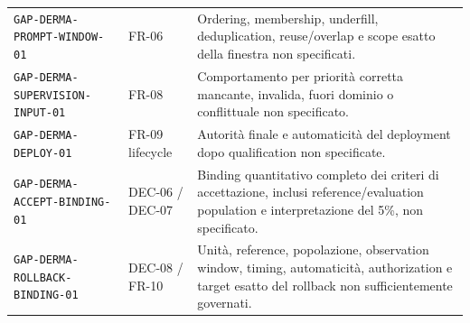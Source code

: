 \documentclass[11pt,a4paper]{article}
\begin{document}
\begin{longtable}{L{50mm}L{29mm}L{64mm}}
\nolinkurl{GAP-DERMA-PROMPT-WINDOW-01} & FR-06 & Ordering, membership, underfill, deduplication, reuse/overlap e scope esatto della finestra non specificati. \\
\nolinkurl{GAP-DERMA-SUPERVISION-INPUT-01} & FR-08 & Comportamento per priorità corretta mancante, invalida, fuori dominio o conflittuale non specificato. \\
\nolinkurl{GAP-DERMA-DEPLOY-01} & FR-09 lifecycle & Autorità finale e automaticità del deployment dopo qualification non specificate. \\
\nolinkurl{GAP-DERMA-ACCEPT-BINDING-01} & DEC-06 / DEC-07 & Binding quantitativo completo dei criteri di accettazione, inclusi reference/evaluation population e interpretazione del 5\%, non specificato. \\
\nolinkurl{GAP-DERMA-ROLLBACK-BINDING-01} & DEC-08 / FR-10 & Unità, reference, popolazione, observation window, timing, automaticità, authorization e target esatto del rollback non sufficientemente governati. \\
\bottomrule
\end{longtable}
\normalsize
\end{document}
